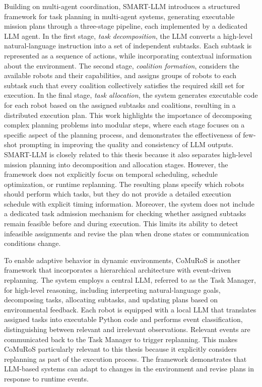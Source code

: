 Building on multi-agent coordination, 
SMART-LLM \cite{kannan2024smartllm} introduces a structured framework for task planning in multi-agent systems, 
generating executable mission plans through a three-stage pipeline, each implemented by a dedicated LLM agent. 
In the first stage, \textit{task decomposition}, the LLM converts a high-level natural-language instruction into a set of independent subtasks. 
Each subtask is represented as a sequence of actions, while incorporating contextual information about the environment. 
The second stage, \textit{coalition formation}, considers the available robots and their capabilities, 
and assigns groups of robots to each subtask such that every coalition collectively satisfies the required skill set for execution. 
In the final stage, \textit{task allocation}, the system generates executable code for each robot based on the assigned subtasks and coalitions, 
resulting in a distributed execution plan. 
This work highlights the importance of decomposing complex planning problems into modular steps, 
where each stage focuses on a specific aspect of the planning process, 
and demonstrates the effectiveness of few-shot prompting in improving the quality and consistency of LLM outputs.
SMART-LLM is closely related to this thesis because it also separates high-level mission planning into decomposition and allocation stages.
However, the framework does not explicitly focus on temporal scheduling, schedule optimization, or runtime replanning.
The resulting plans specify which robots should perform which tasks, but they do not provide a detailed execution schedule with explicit timing information.
Moreover, the system does not include a dedicated task admission mechanism for checking whether assigned subtasks remain feasible before and during execution.
This limits its ability to detect infeasible assignments and revise the plan when drone states or communication conditions change.

To enable adaptive behavior in dynamic environments, 
CoMuRoS \cite{borate2025hierarchical} is another framework that incorporates a hierarchical architecture 
with event-driven replanning. 
The system employs a central LLM, referred to as the Task Manager, for high-level reasoning, 
including interpreting natural-language goals, decomposing tasks, allocating subtasks, and updating plans 
based on environmental feedback. 
Each robot is equipped with a local LLM that translates assigned tasks 
into executable Python code and performs event classification, distinguishing between relevant and 
irrelevant observations. 
Relevant events are communicated back to the Task Manager to trigger replanning. 
This makes CoMuRoS particularly relevant to this thesis because it explicitly considers replanning as part of the execution process.
The framework demonstrates that LLM-based systems can adapt to changes in the environment and revise plans in response to runtime events.

